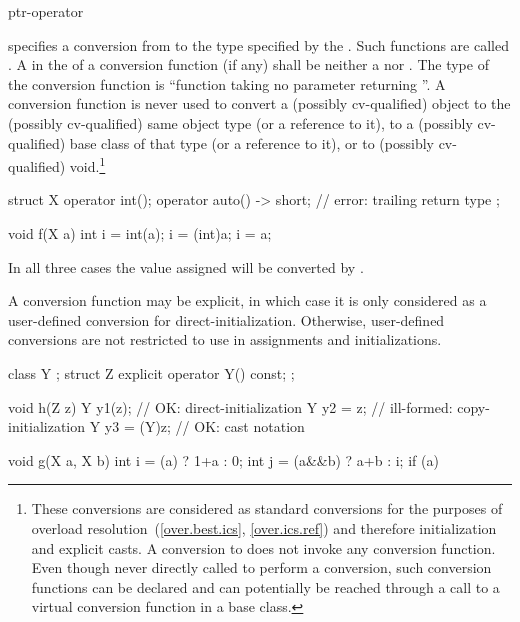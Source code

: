 \begin{bnf}
\br
    ptr-operator 
\end{bnf}
specifies a conversion from
to the type specified by the
.
Such functions are called .
A  in the 
of a conversion function (if any) shall be neither
a  nor .
%
The type of the conversion function is
``function taking no parameter returning
''.
A conversion function is never used to convert a (possibly cv-qualified) object
to the (possibly cv-qualified) same object type (or a reference to it),
to a (possibly cv-qualified) base class of that type (or a reference to it),
or to (possibly cv-qualified) void.\footnote{These conversions are considered
as standard conversions for the purposes of overload resolution~(\ref{over.best.ics}, \ref{over.ics.ref}) and therefore initialization and explicit casts. A conversion to  does not invoke any conversion function.
Even though never directly called to perform a conversion,
such conversion functions can be declared and can potentially
be reached through a call to a virtual conversion function in a base class.}
\begin{example}
\begin{codeblock}
struct X {
  operator int();
  operator auto() -> short;     // error: trailing return type
};

void f(X a) {
  int i = int(a);
  i = (int)a;
  i = a;
}
\end{codeblock}
In all three cases the value assigned will be converted by
.
\end{example}

\pnum
A conversion function may be explicit, in which case it is only considered as a user-defined conversion for direct-initialization. Otherwise, user-defined conversions are not restricted to use in assignments and initializations.
\begin{example}
\begin{codeblock}
class Y { };
struct Z {
  explicit operator Y() const;
};

void h(Z z) {
  Y y1(z);          // OK: direct-initialization
  Y y2 = z;         // ill-formed: copy-initialization
  Y y3 = (Y)z;      // OK: cast notation
}

void g(X a, X b) {
  int i = (a) ? 1+a : 0;
  int j = (a&&b) ? a+b : i;
  if (a) {
  }
}
\end{codeblock}
\end{example}

